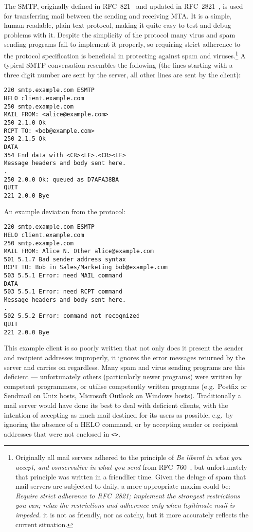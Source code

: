 The \acrlong{SMTP}, originally defined in \gls{RFC}~821~\cite{RFC821} and
updated in \gls{RFC}~2821~\cite{RFC2821}, is used for transferring mail
between the sending and receiving \gls{MTA}\@.  It is a simple, human
readable, plain text protocol, making it quite easy to test and debug
problems with it.  Despite the simplicity of the protocol many virus and
spam sending programs fail to implement it properly, so requiring strict
adherence to the protocol specification is beneficial in protecting against
spam and viruses.\footnote{\label{footnote:rfc760}Originally all mail
servers adhered to the principle of \textit{Be liberal in what you accept,
and conservative in what you send\/} from \gls{RFC}~760~\cite{rfc760}, but
unfortunately that principle was written in a friendlier time.  Given the
deluge of spam that mail servers are subjected to daily, a more appropriate
maxim could be: \textit{Require strict adherence to \gls{RFC}~2821;
implement the strongest restrictions you can; relax the restrictions and
adherence only when legitimate mail is impeded.\/}  it is not as friendly,
nor as catchy, but it more accurately reflects the current situation.} A
typical \gls{SMTP} conversation resembles the following (the lines starting
with a three digit number are sent by the server, all other lines are sent
by the client):

\begin{verbatim}
220 smtp.example.com ESMTP
HELO client.example.com
250 smtp.example.com
MAIL FROM: <alice@example.com>
250 2.1.0 Ok
RCPT TO: <bob@example.com>
250 2.1.5 Ok
DATA
354 End data with <CR><LF>.<CR><LF>
Message headers and body sent here.
.
250 2.0.0 Ok: queued as D7AFA38BA
QUIT
221 2.0.0 Bye
\end{verbatim}

An example deviation from the protocol:

\begin{verbatim}
220 smtp.example.com ESMTP
HELO client.example.com
250 smtp.example.com
MAIL FROM: Alice N. Other alice@example.com
501 5.1.7 Bad sender address syntax
RCPT TO: Bob in Sales/Marketing bob@example.com
503 5.5.1 Error: need MAIL command
DATA
503 5.5.1 Error: need RCPT command
Message headers and body sent here.
.
502 5.5.2 Error: command not recognized
QUIT
221 2.0.0 Bye
\end{verbatim}

This example client is so poorly written that not only does it present the
sender and recipient addresses improperly, it ignores the error messages
returned by the server and carries on regardless.  Many spam and virus
sending programs are this deficient --- unfortunately others (particularly
newer programs) were written by competent programmers, or utilise
competently written programs (e.g.\ Postfix or Sendmail on Unix hosts,
Microsoft Outlook on Windows hosts).  Traditionally a mail server would
have done its best to deal with deficient clients, with the intention of
accepting as much mail destined for its users as
possible, e.g.\ by ignoring the absence of a HELO
command, or by accepting sender or recipient addresses that were not
enclosed in \texttt{<>}.  

